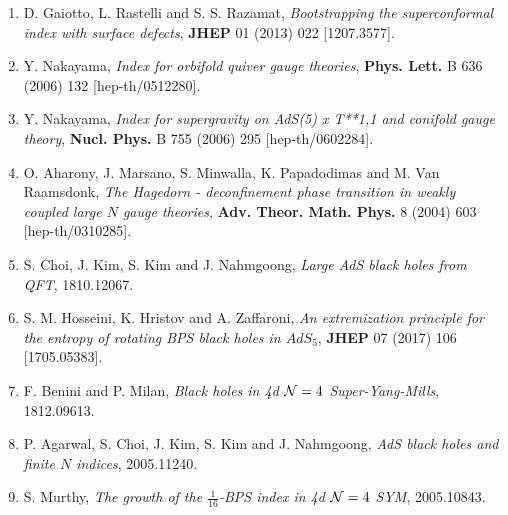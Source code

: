 \begin{enumerate}
\item[{[39]}] D. Gaiotto, L. Rastelli and S. S. Razamat, \textit{Bootstrapping the superconformal index with surface defects}, \textbf{JHEP} 01 (2013) 022 [1207.3577].
\item[{[40]}] Y. Nakayama, \textit{Index for orbifold quiver gauge theories}, \textbf{Phys. Lett.} B 636 (2006) 132 [hep-th/0512280].
\item[{[41]}] Y. Nakayama, \textit{Index for supergravity on AdS(5) x T**1,1 and conifold gauge theory}, \textbf{Nucl. Phys.} B 755 (2006) 295 [hep-th/0602284].
\item[{[42]}] O. Aharony, J. Marsano, S. Minwalla, K. Papadodimas and M. Van Raamsdonk, \textit{The Hagedorn - deconfinement phase transition in weakly coupled large $N$ gauge theories}, \textbf{Adv. Theor. Math. Phys.} 8 (2004) 603 [hep-th/0310285].
\item[{[43]}] S. Choi, J. Kim, S. Kim and J. Nahmgoong, \textit{Large AdS black holes from QFT}, 1810.12067.
\item[{[44]}] S. M. Hosseini, K. Hristov and A. Zaffaroni, \textit{An extremization principle for the entropy of rotating BPS black holes in $AdS_5$}, \textbf{JHEP} 07 (2017) 106 [1705.05383].
\item[{[45]}] F. Benini and P. Milan, \textit{Black holes in 4d $\mathcal{N} = 4$ Super-Yang-Mills}, 1812.09613.
\item[{[46]}] P. Agarwal, S. Choi, J. Kim, S. Kim and J. Nahmgoong, \textit{AdS black holes and finite $N$ indices}, 2005.11240.
\item[{[47]}] S. Murthy, \textit{The growth of the $\frac{1}{16}$-BPS index in 4d $\mathcal{N} = 4$ SYM}, 2005.10843.
\end{enumerate}


